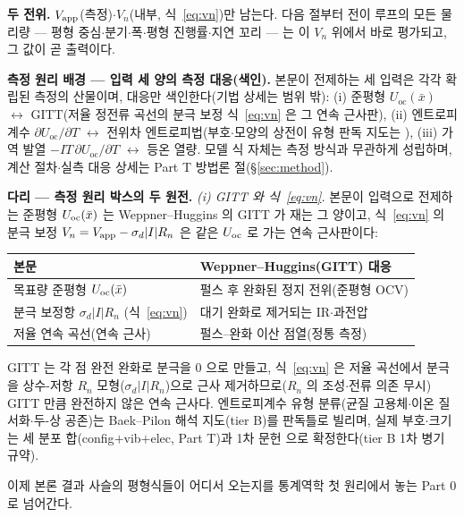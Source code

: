 \begin{keybox}
\textbf{두 전위.} $V_{\mathrm{app}}$(측정)$\cdot$$V_n$(내부, 식~\eqref{eq:vn})만 남는다. 다음 절부터 전이 루프의 모든
물리량 --- 평형 중심$\cdot$분기$\cdot$폭$\cdot$평형 진행률$\cdot$지연 꼬리 --- 는 이 $V_n$ 위에서 바로
평가되고, 그 값이 곧 출력이다.
\end{keybox}

\begin{bgbox}
\textbf{측정 원리 배경 --- 입력 세 양의 측정 대응(색인).} 본문이 전제하는 세 입력은 각각 확립된 측정의
산물이며, 대응만 색인한다(기법 상세는 범위 밖): (i) 준평형 $U_\mathrm{oc}(\bar x)$ $\leftrightarrow$
GITT\cite{weppner_huggins1977}(저율 정전류 곡선의 분극 보정 식~\eqref{eq:vn} 은 그 연속 근사판), (ii) 엔트로피
계수 $\partial U_\mathrm{oc}/\partial T$ $\leftrightarrow$ 전위차 엔트로피법\cite{reynier2003,swiderska2019}(부호$\cdot$모양의
상전이 유형 판독 지도는 \cite{baek_pilon2022}), (iii) 가역 발열 $-IT\,\partial U_\mathrm{oc}/\partial T$
$\leftrightarrow$ 등온 열량. 모델 식 자체는 측정 방식과 무관하게 성립하며, 계산 절차$\cdot$실측 대응 상세는
Part T 방법론 절(\S\ref{sec:method}).
\end{bgbox}

\begin{srcbox}
\textbf{다리 --- 측정 원리 박스의 두 원전.} \emph{(i) GITT 와 식~\eqref{eq:vn}.} 본문이 입력으로 전제하는 준평형 $U_{\mathrm{oc}}(\bar x)$ 는
Weppner--Huggins 의 GITT\cite{weppner_huggins1977} 가 재는 그 양이고, 식~\eqref{eq:vn} 의 분극 보정
$V_n=V_{\mathrm{app}}-\sigma_d|I|R_n$ 은 같은 $U_{\mathrm{oc}}$ 로 가는 연속 근사판이다:
\begin{center}\footnotesize
\begin{tabular}{@{}ll@{}}
\hline
본문 & Weppner--Huggins\cite{weppner_huggins1977}(GITT) 대응 \\
\hline
목표량 준평형 $U_{\mathrm{oc}}(\bar x)$ & 펄스 후 완화된 정지 전위(준평형 OCV) \\
분극 보정항 $\sigma_d|I|R_n$ (식~\eqref{eq:vn}) & 대기 완화로 제거되는 IR$\cdot$과전압 \\
저율 연속 곡선(연속 근사) & 펄스--완화 이산 점열(정통 측정) \\
\hline
\end{tabular}
\end{center}
GITT 는 각 점 완전 완화로 분극을 $0$ 으로 만들고, 식~\eqref{eq:vn} 은 저율 곡선에서 분극을 상수-저항 $R_n$
모형($\sigma_d|I|R_n$)으로 근사 제거하므로($R_n$ 의 조성$\cdot$전류 의존 무시) GITT 만큼 완전하지 않은 연속 근사다.
엔트로피계수 유형 분류(균질 고용체$\cdot$이온 질서화$\cdot$두-상 공존)는 Baek--Pilon 해석 지도\cite{baek_pilon2022}(tier B)를
판독틀로 빌리며, 실제 부호$\cdot$크기는 세 분포 합(config$+$vib$+$elec, Part T)과 1차 문헌\cite{reynier2003,allart2018}
으로 확정한다(tier B 1차 병기 규약).
\end{srcbox}

이제 본론 결과 사슬의 평형식들이 어디서 오는지를 통계역학 첫 원리에서 놓는 Part 0 로 넘어간다.

